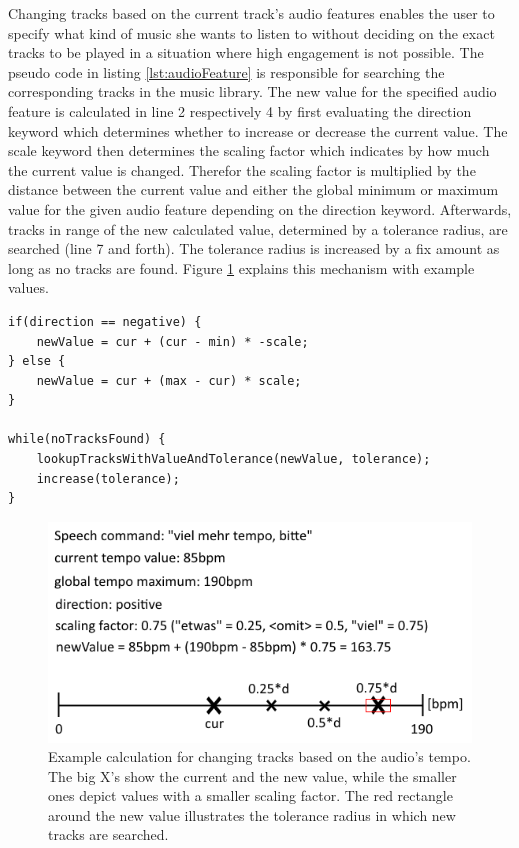 Changing tracks based on the current track's audio features enables the user to specify what kind of music she wants to listen to without deciding on the exact tracks to be played in a situation where high engagement is not possible. The pseudo code in listing \ref{lst:audioFeature} is responsible for searching the corresponding tracks in the music library. The new value for the specified audio feature is calculated in line 2 respectively 4 by first evaluating the direction keyword which determines whether to increase or decrease the current value. The scale keyword then determines the scaling factor which indicates by how much the current value is changed. Therefor the scaling factor is multiplied by the distance between the current value and either the global minimum or maximum value for the given audio feature depending on the direction keyword. Afterwards, tracks in  range of the new calculated value, determined by a tolerance radius, are searched (line 7 and forth). The tolerance radius is increased by a fix amount as long as no tracks are found. Figure \ref{fig:audioFeatureExample} explains this mechanism with example values.

\begin{lstlisting}[caption=Pseudo code for calculating the new audio feature value and looking up respective tracks with a tolerance radius from the music library, label=lst:audioFeature]
if(direction == negative) {
	newValue = cur + (cur - min) * -scale;
} else {
	newValue = cur + (max - cur) * scale;
}

while(noTracksFound) {
	lookupTracksWithValueAndTolerance(newValue, tolerance);
	increase(tolerance);
}
\end{lstlisting}

\begin{figure}[bth]
	\myfloatalign
	\includegraphics[width=.7\linewidth]{img/calcAudioFeatureExample.png}
	\caption{Example calculation for changing tracks based on the audio's tempo. The big X's show the current and the new value, while the smaller ones depict values with a smaller scaling factor. The red rectangle around the new value illustrates the tolerance radius in which new tracks are searched.}
	\label{fig:audioFeatureExample}
\end{figure}


